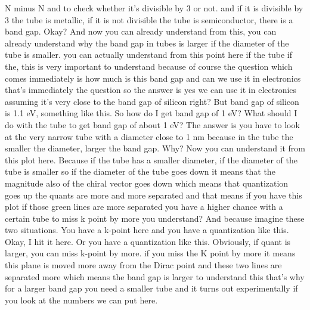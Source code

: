 N minus N and to check whether it's divisible by 3 or not. and if it is divisible by 3 the tube is metallic, if it is not divisible the tube is semiconductor, there is a band gap. Okay? And now you can already understand from this, you can already understand why the band gap in tubes is larger if the diameter of the tube is smaller. you can actually understand from this point here if the tube if the, this is very important to understand because of course the question which comes immediately is how much is this band gap and can we use it in electronics that's immediately the question so the answer is yes we can use it in electronics assuming it's very close to the band gap of silicon right? But band gap of silicon is 1.1 eV, something like this. So how do I get band gap of 1 eV? What should I do with the tube to get band gap of about 1 eV? The answer is you have to look at the very narrow tube with a diameter close to 1 nm because in the tube the smaller the diameter, larger the band gap. Why? Now you can understand it from this plot here. Because if the tube has a smaller diameter, if the diameter of the tube is smaller so if the diameter of the tube goes down it means that the magnitude also of the chiral vector goes down which means that quantization goes up the quants are more and more separated and that means if you have this plot if those green lines are more separated you have a higher chance with a certain tube to miss k point by more you understand? And because imagine these two situations. You have a k-point here and you have a quantization like this. Okay, I hit it here. Or you have a quantization like this. Obviously, if quant is larger, you can miss k-point by more. if you miss the K point by more it means this plane is moved more away from the Dirac point and these two lines are separated more which means the band gap is larger to understand this that's why for a larger band gap you need a smaller tube and it turns out experimentally if you look at the numbers we can put here.
